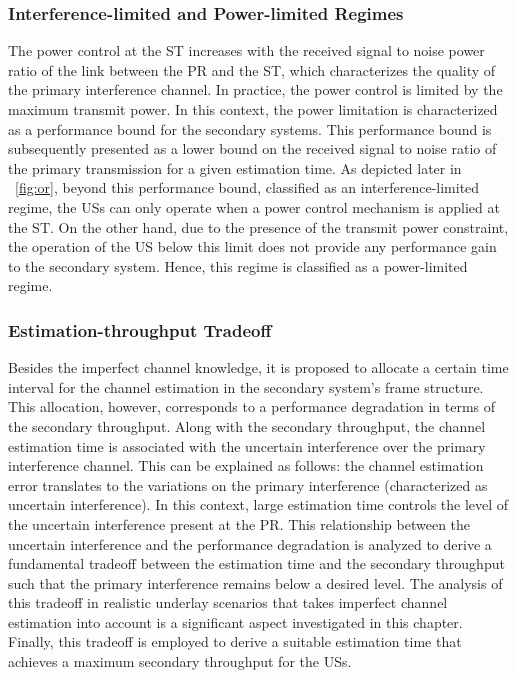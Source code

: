 \subsubsection{Interference-limited and Power-limited Regimes}
The power control at the ST increases with the received signal to noise power ratio of the link between the PR and the ST, which characterizes the quality of the primary interference channel. In practice, the power control is limited by the maximum transmit power. In this context, the power limitation is characterized as a performance bound for the secondary systems. This performance bound is subsequently presented as a lower bound on the received signal to noise ratio of the primary transmission for a given estimation time. As depicted later in \figurename~\ref{fig:or}, beyond this performance bound, classified as an interference-limited regime, the USs can only operate when a power control mechanism is applied at the ST. On the other hand, due to the presence of the transmit power constraint, the operation of the US below this limit does not provide any performance gain to the secondary system. Hence, this regime is classified as a power-limited regime. 
\subsubsection{Estimation-throughput Tradeoff}
Besides the imperfect channel knowledge, it is proposed to allocate a certain time interval for the channel estimation in the secondary system's frame structure. This allocation, however, corresponds to a performance degradation in terms of the secondary throughput. Along with the secondary throughput, the channel estimation time is associated with the uncertain interference over the primary interference channel. This can be explained as follows: the channel estimation error translates to the variations on the primary interference (characterized as uncertain interference). In this context, large estimation time controls the level of the uncertain interference present at the PR. This relationship between the uncertain interference and the performance degradation is analyzed to derive a fundamental tradeoff between the estimation time and the secondary throughput such that the primary interference remains below a desired level. The analysis of this tradeoff in realistic underlay scenarios that takes imperfect channel estimation into account is a significant aspect investigated in this chapter. Finally, this tradeoff is employed to derive a suitable estimation time that achieves a maximum secondary throughput for the USs. %
